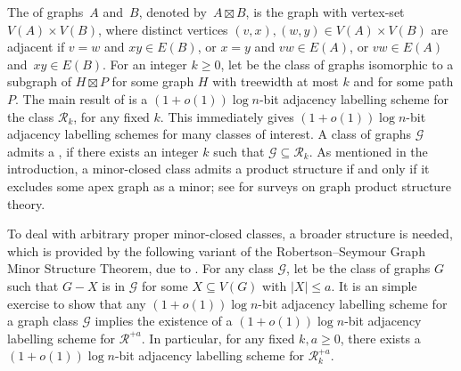
The  of graphs~$A$ and~$B$, denoted by~${A \boxtimes B}$, is the graph with vertex-set ${V(A) \times V(B)}$, where distinct vertices ${(v,x),(w,y) \in V(A) \times V(B)}$ are adjacent if
${v=w}$ and ${xy \in E(B)}$, or
${x=y}$ and ${vw \in E(A)}$, or
${vw \in E(A)}$ and~${xy \in E(B)}$.
For an integer $k\geq 0$, let  be the class of graphs isomorphic to a subgraph of $H\boxtimes P$ for some graph $H$ with treewidth at most $k$ and for some path $P$.
The main result of \citet{dujmovic.esperet.ea:adjacency} is a $(1+o(1))\log n$-bit adjacency labelling scheme for the class $\mathcal{R}_k$, for any fixed $k$.
This immediately gives $(1+o(1))\log n$-bit adjacency labelling schemes for many classes of interest.
A class of graphs $\mathcal{G}$ admits a , if there exists an integer $k$ such that $\mathcal{G}\subseteq \mathcal{R}_k$. As mentioned in the introduction, a minor-closed class admits a product structure if and only if it excludes some apex graph as a minor; see \citep{Dujmovic26,DHJLW21,DujWoo-ECM} for surveys on graph product structure theory.  

To deal with arbitrary proper minor-closed classes, a broader structure is needed, which is provided by the following variant of the Robertson--Seymour Graph Minor Structure Theorem, due to \citet{dujmovic.joret.ea:planar}. For any class $\mathcal{G}$, let  be the class of graphs $G$ such that $G-X$ is in $\mathcal{G}$ for some $X\subseteq V(G)$ with $|X|\leq a$.  It is an simple exercise to show that any $(1+o(1))\log n$-bit adjacency labelling scheme for a graph class $\mathcal{G}$ implies the existence of a $(1+o(1))\log n$-bit adjacency labelling scheme for $\mathcal{R}^{+a}$.  In particular, for any fixed $k,a\ge 0$, there exists a $(1+o(1))\log n$-bit adjacency labelling scheme for $\mathcal{R}^{+a}_k$.

